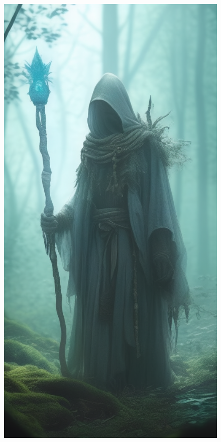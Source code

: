 \begin{figure}
\begin{center}
\includegraphics[scale=0.34]{img/ai-images/ghostly-wizard.png}
\end{center}
\end{figure}


